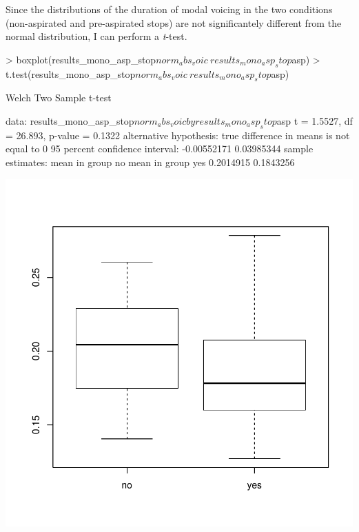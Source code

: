 \documentclass{article}
\begin{document}
Since the distributions of the duration of modal voicing in the two conditions (non-aspirated and pre-aspirated stops) are not significantely different from the normal distribution, I can perform a \textit{t}-test.

\begin{Schunk}
\begin{Sinput}
> boxplot(results_mono_asp_stop$norm_abs_voic~results_mono_asp_stop$asp)
> t.test(results_mono_asp_stop$norm_abs_voic~results_mono_asp_stop$asp)
\end{Sinput}
\begin{Soutput}
	Welch Two Sample t-test

data:  results_mono_asp_stop$norm_abs_voic by results_mono_asp_stop$asp
t = 1.5527, df = 26.893, p-value = 0.1322
alternative hypothesis: true difference in means is not equal to 0
95 percent confidence interval:
 -0.00552171  0.03985344
sample estimates:
 mean in group no mean in group yes 
        0.2014915         0.1843256 
\end{Soutput}
\end{Schunk}
\includegraphics{analysis-010}
\end{document}
